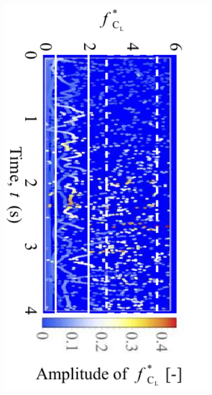 \documentclass[oneside]{utmthesis}
\begin{document}
\begin{figure}[H]
\begin{subfigure}[h]{0.49\textwidth}
    \includegraphics[angle=90,width=1\textwidth]{figs/instantLiftFreq-c}
    \caption{}
    \label{fig:instantLiftFreq-c}
  \end{subfigure}
  \hfill
  \begin{subfigure}[h]{0.49\textwidth}

\end{subfigure}
\end{figure}
\end{document}
